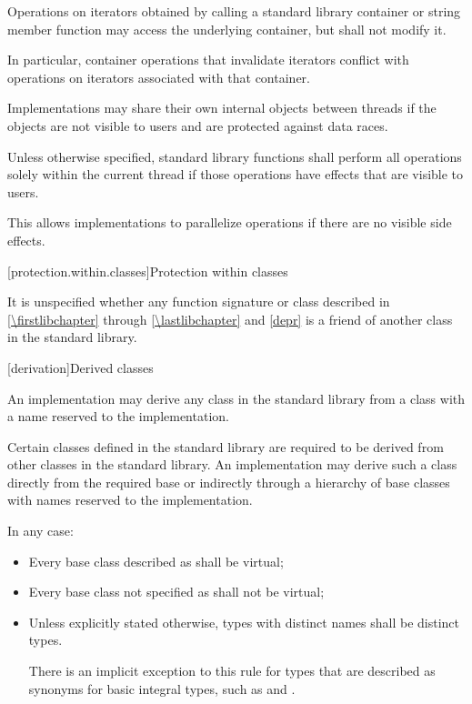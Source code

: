 \pnum
Operations on iterators obtained by calling a standard library container or string
member function may access the underlying container, but shall not modify it.
\begin{note}
In particular, container operations that invalidate iterators conflict
with operations on iterators associated with that container.
\end{note}

\pnum
Implementations may share their own internal objects between threads if the objects are
not visible to users and are protected against data races.

\pnum
Unless otherwise specified, \Cpp{} standard library functions shall perform all operations
solely within the current thread if those operations have effects that are
visible to users.

\pnum
\begin{note}
This allows implementations to parallelize operations if there are no visible
%
side effects.
\end{note}

[protection.within.classes]{Protection within classes}

\pnum
{}%
It is unspecified whether any function signature or class described in
\ref{\firstlibchapter} through \ref{\lastlibchapter} and \ref{depr} is a
friend of another class in the \Cpp{} standard library.

[derivation]{Derived classes}

\pnum
{}%
%
An implementation may derive any class in the \Cpp{} standard library from a class with a
name reserved to the implementation.

\pnum
Certain classes defined in the \Cpp{} standard library are required to be derived from
other classes
in the \Cpp{} standard library.
%
An implementation may derive such a class directly from the required base or indirectly
through a hierarchy of base classes with names reserved to the implementation.

\pnum
In any case:
\begin{itemize}
\item
Every base class described as
shall be virtual;
%
\item
Every base class not specified as
 shall not be virtual;
\item
Unless explicitly stated otherwise, types with distinct names shall be distinct
types.
\begin{footnote}
There is an implicit exception to this rule for types that are
described as synonyms for basic integral types, such as
 and
.
\end{footnote}
\end{itemize}

